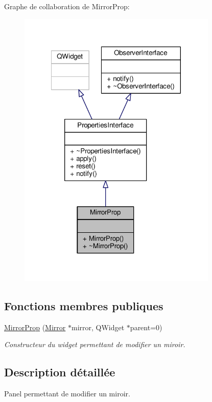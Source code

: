 Graphe de collaboration de Mirror\+Prop\+:
\nopagebreak
\begin{figure}[H]
\begin{center}
\leavevmode
\includegraphics[width=269pt]{d3/d3c/classMirrorProp__coll__graph}
\end{center}
\end{figure}
\subsection*{Fonctions membres publiques}
\begin{DoxyCompactItemize}
\item 
\hyperlink{classMirrorProp_a66f3827e136a4de797881f58e3b2c2f5}{Mirror\+Prop} (\hyperlink{classMirror}{Mirror} $\ast$mirror, Q\+Widget $\ast$parent=0)
\begin{DoxyCompactList}\small\item\em Constructeur du widget permettant de modifier un miroir. \end{DoxyCompactList}\end{DoxyCompactItemize}


\subsection{Description détaillée}
Panel permettant de modifier un miroir. 

